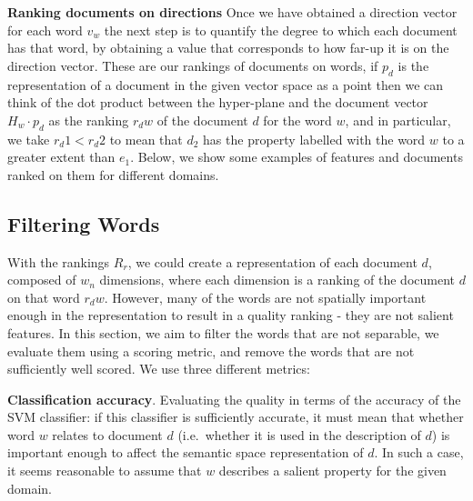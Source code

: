 \noindent \textbf{Ranking documents on directions} Once we have obtained a direction vector for each word $v_w$ the next step is to quantify the degree to which each document has that word, by obtaining a value that corresponds to how far-up it is on the direction vector. These are our rankings of documents on words, if $p_d$ is the representation of a document in the given vector space as a point then we can think of the dot product between the hyper-plane and the document vector $H_w \cdot p_d$ as the ranking $r_dw$ of the document $d$ for the word $w$, and in particular, we take $r_d1 < r_d2$ to mean that $d_2$ has the property labelled with the word $w$ to a greater extent than $e_1$. Below, we show some examples of features and documents ranked on them for different domains. %









\subsection{Filtering Words}

With the rankings $R_r$, we could create a representation of each document $d$, composed of $w_n$ dimensions, where each dimension is a ranking of the document $d$ on that word $r_dw$. However, many of the words are not spatially important enough in the representation to result in a quality ranking - they are not salient features. In this section, we aim to filter the words that are not separable, we evaluate them using a scoring metric, and remove the words that are not sufficiently well scored. We use three different metrics:

\noindent \textbf{Classification accuracy}. Evaluating the quality in terms of the accuracy of the SVM classifier: if this classifier is sufficiently accurate, it must mean that whether word $w$ relates to document $d$ (i.e.\ whether it is used in the description of $d$) is important enough to affect the semantic space representation of $d$. In such a case, it seems reasonable to assume that $w$ describes a salient property for the given domain.%
\smallskip


